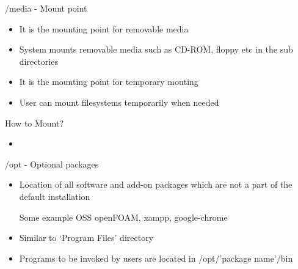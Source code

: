 \documentclass{beamer}
\newcommand{\insertcode}[2]{\begin{itemize}\item[]\end{itemize}} %
\begin{document}
\begin{frame}{/media - Mount point}
\begin{itemize}
\setlength\itemsep{0.8em}
\item It is the mounting point for removable media
\item System mounts removable media such as CD-ROM, floppy etc in the sub directories
\end{itemize}

\vspace{0.5cm}
\pause
\begin{Large}
\end{Large}

\begin{itemize}
\setlength\itemsep{0.8em}
\item It is the mounting point for temporary mouting
\item User can mount filesystems temporarily when needed
\end{itemize}
\pause
\begin{block}{How to Mount?}
\insertcode{scripts/mount_command.sh}{}
\end{block}

\end{frame}

\begin{frame}{/opt - Optional packages}
\begin{itemize}
\setlength\itemsep {0.8em}
\item Location of all software and add-on packages which are not a part of the default installation
\begin{block}{Some example OSS}
openFOAM, xampp, google-chrome
\end{block}	
\item Similar to `Program Files' directory
\item  Programs to be invoked by users are
located in /opt/'package name'/bin
\end{itemize}
\end{frame}
\end{document}
